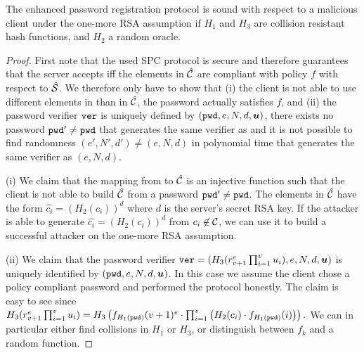 \begin{lemma}[Soundness]\label{lem:soundness}
 The enhanced password registration protocol is sound with respect to a malicious client under the one-more RSA assumption if $H_1$ and $H_3$ are collision resistant hash functions, and $H_2$ a random oracle.
\end{lemma}

\begin{proof}
  First note that the used \ac{SPC} protocol is secure and therefore guarantees that the server accepts iff the elements in $\hat{\mathcal{C}}$ are compliant with policy $f$ with respect to $\hat{\mathcal{S}}$.
  We therefore only have to show that (i) the client is not able to use different elements in \cC than in $\hat{\mathcal{C}}$, \ie the password \pwd actually satisfies $f$, and (ii) the password verifier $\mathtt{ver}$ is uniquely defined by $(\mathtt{pwd}, e, N, d, \bm{u})$, \ie there exists no password $\mathtt{pwd}'\not=\mathtt{pwd}$ that generates the same verifier as \pwd and it is not possible to find randomness $(e',N', d')\not=(e, N, d)$ in polynomial time that generates the same verifier as $(e,N, d)$.
  
  (i) We claim that the mapping from \cC to $\hat{\mathcal{C}}$ is an injective function such that the client is not able to build $\hat{\mathcal{C}}$ from a password $\mathtt{pwd}'\not=\mathtt{pwd}$.
  The elements in $\hat{\mathcal{C}}$ have the form $\hat{c_i}=(H_2(c_i))^d$ where $d$ is the server's secret RSA key.
  If the attacker is able to generate $\hat{c_i}=(H_2(c_i))^d$ from $c_i\not\in\mathcal{C}$, we can use it to build a successful attacker on the one-more RSA assumption.
  
  (ii) We claim that the password verifier $\mathtt{ver}=(H_3(r_{v+1}^e\prod_{i=1}^{v} u_i), e, N, d, \bm{u})$ is uniquely identified by $(\mathtt{pwd}, e, N, d, \bm{u})$.
  In this case we assume the client chose a policy compliant password \pwd and performed the protocol honestly.
  The claim is easy to see since 
  $
    H_3(r_{v+1}^e\prod_{i=1}^{v} u_i) = 
    H_3\left(f_{H_1(\mathtt{pwd})}(v+1)^e \cdot \prod_{i=1}^{v} \left(H_2(c_i)\cdot f_{H_1(\mathtt{pwd})}(i)\right)\right).
  $
  We can in particular either find collisions in $H_1$ or $H_3$, or distinguish between $f_k$ and a random function.
\end{proof}
